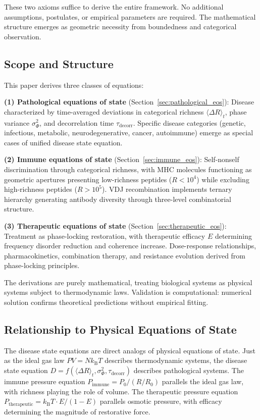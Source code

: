 \documentclass[11pt,twocolumn,a4paper]{article}
\theoremstyle{definition}
\theoremstyle{remark}
\newcommand{\kB}{k_{\mathrm{B}}}
\newcommand{\taudecorr}{\tau_{\mathrm{decorr}}}
\begin{document}
These two axioms suffice to derive the entire framework. No additional assumptions, postulates, or empirical parameters are required. The mathematical structure emerges as geometric necessity from boundedness and categorical observation.

\subsection{Scope and Structure}

This paper derives three classes of equations:

\textbf{(1) Pathological equations of state} (Section~\ref{sec:pathological_eos}): Disease characterized by time-averaged deviations in categorical richness $\langle\Delta R\rangle_t$, phase variance $\sigma_\Phi^2$, and decorrelation time $\taudecorr$. Specific disease categories (genetic, infectious, metabolic, neurodegenerative, cancer, autoimmune) emerge as special cases of unified disease state equation.

\textbf{(2) Immune equations of state} (Section~\ref{sec:immune_eos}): Self-nonself discrimination through categorical richness, with MHC molecules functioning as geometric apertures presenting low-richness peptides ($R < 10^4$) while excluding high-richness peptides ($R > 10^5$). VDJ recombination implements ternary hierarchy generating antibody diversity through three-level combinatorial structure.

\textbf{(3) Therapeutic equations of state} (Section~\ref{sec:therapeutic_eos}): Treatment as phase-locking restoration, with therapeutic efficacy $E$ determining frequency disorder reduction and coherence increase. Dose-response relationships, pharmacokinetics, combination therapy, and resistance evolution derived from phase-locking principles.

The derivations are purely mathematical, treating biological systems as physical systems subject to thermodynamic laws. Validation is computational: numerical solution confirms theoretical predictions without empirical fitting.

\subsection{Relationship to Physical Equations of State}

The disease state equations are direct analogs of physical equations of state. Just as the ideal gas law $PV = N\kB T$ describes thermodynamic systems, the disease state equation $D = f(\langle\Delta R\rangle_t, \sigma_\Phi^2, \taudecorr)$ describes pathological systems. The immune pressure equation $P_{\mathrm{immune}} = P_0/(R/R_0)$ parallels the ideal gas law, with richness playing the role of volume. The therapeutic pressure equation $P_{\mathrm{therapeutic}} = \kB T \cdot E/(1-E)$ parallels osmotic pressure, with efficacy determining the magnitude of restorative force.
\end{document}
